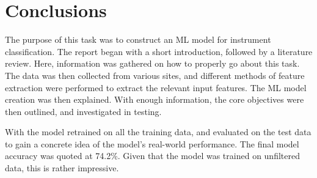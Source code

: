 \documentclass[class=report,11pt,crop=false]{standalone}
\begin{document}
\ifstandalone
\tableofcontents
\fi
\section{Conclusions \label{ch:conclusions}}

The purpose of this task was to construct an ML model for instrument classification. The report began with a short introduction, followed by a literature review. Here, information was gathered on how to properly go about this task. The data was then collected from various sites, and different methods of feature extraction were performed to extract the relevant input features. The ML model creation was then explained. With enough information, the core objectives were then outlined, and investigated in testing. 

With the model retrained on all the training data, and evaluated on the test data to gain a concrete idea of the model's real-world performance. The final model accuracy was quoted at 74.2\%. Given that the model was trained on unfiltered data, this is rather impressive.

\ifstandalone

\printnoidxglossary[type=\acronymtype,nonumberlist]
\fi
\end{document}
